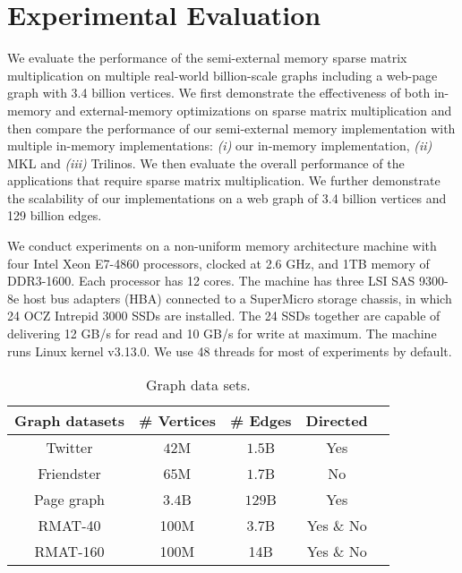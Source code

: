 \section{Experimental Evaluation}

We evaluate the performance of the semi-external memory sparse matrix
multiplication on multiple real-world billion-scale graphs including a web-page
graph with 3.4 billion vertices. We first demonstrate the effectiveness of
both in-memory and external-memory optimizations on sparse matrix multiplication
and then compare the performance of our semi-external memory implementation with
multiple in-memory implementations: \textit{(i)} our in-memory implementation,
\textit{(ii)} MKL and \textit{(iii)} Trilinos. We then evaluate the overall
performance of the applications that require sparse matrix multiplication.
We further demonstrate the scalability of our implementations on a web graph
of 3.4 billion vertices and 129 billion edges.

We conduct experiments on a non-uniform memory architecture machine with
four Intel Xeon E7-4860 processors, clocked at 2.6 GHz, and 1TB memory of
DDR3-1600. Each processor has 12 cores. The machine has three LSI SAS 9300-8e
host bus adapters (HBA) connected to a SuperMicro storage chassis, in which
24 OCZ Intrepid 3000 SSDs are installed. The 24 SSDs together are capable of
delivering 12 GB/s for read and 10 GB/s for write at maximum. The machine runs
Linux kernel v3.13.0. We use 48 threads for most of experiments by default.

\begin{table}
\begin{center}
\footnotesize
\begin{tabular}{|c|c|c|c|c|}
\hline
Graph datasets & \# Vertices & \# Edges & Directed \\
\hline
Twitter \cite{twitter} & $42$M & $1.5$B & Yes \\
\hline
Friendster \cite{friendster} & $65$M & $1.7$B & No \\
\hline
Page graph \cite{web_graph} & $3.4$B & $129$B & Yes \\
\hline
RMAT-40 \cite{rmat} & 100M & 3.7B & Yes \& No \\
\hline
RMAT-160 \cite{rmat} & 100M & 14B & Yes \& No \\
\hline
\end{tabular}
\normalsize
\end{center}
\caption{Graph data sets.}
\label{graphs}
\end{table}

